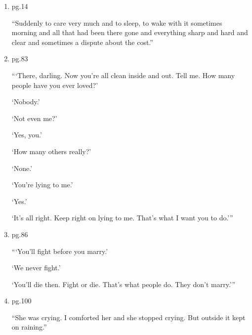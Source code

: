 \documentclass{article}
\title{\jobname}
\author{Eugenio Animali}
\begin{document}
\maketitle

\begin{enumerate}
\item pg.14
\begin{center}
    ``Suddenly to care very much and to sleep, to wake with it sometimes morning and all that had been there gone and everything sharp and hard and clear and sometimes a dispute about the cost.''
\end{center}
\item pg.83
\begin{center}
    ```There, darling. Now you're all clean inside and out. Tell me. How many people have you ever loved?'

    `Nobody.'

    `Not even me?'

    `Yes, you.'

    `How many others really?'

    `None.'

    `You're lying to me.'

    `Yes.'

    `It's all right. Keep right on lying to me. That's what I want you to do.'''
\end{center}
\item pg.86
\begin{center}
    ```You'll fight before you marry.'
    
    `We never fight.'
    
    `You'll die then. Fight or die. That's what people do. They don't marry.'''
\end{center}
\item pg.100
\begin{center}
``She was crying. I comforted her and she stopped crying. But outside it kept on raining.''
\end{center}
\end{enumerate}
\end{document}
